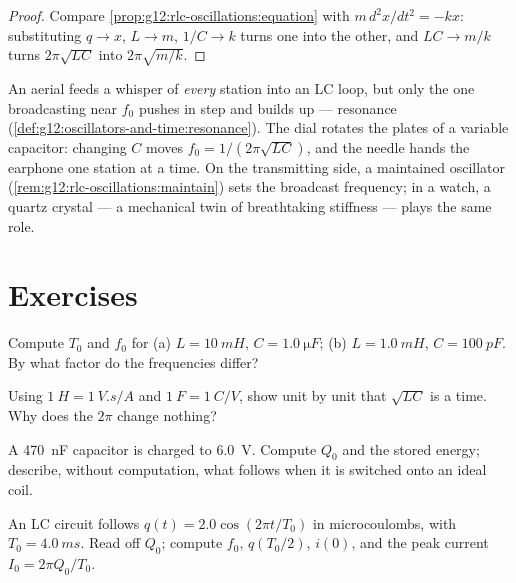 \begin{proof}
Compare \cref{prop:g12:rlc-oscillations:equation} with
$m\,d^2x/dt^2 = -kx$: substituting $q \to x$, $L \to m$, $1/C \to k$
turns one into the other, and $LC \to m/k$ turns
$2\pi\sqrt{LC}$ into $2\pi\sqrt{m/k}$.
\end{proof}

\begin{example}\label{ex:g12:rlc-oscillations:tuning}
An aerial feeds a whisper of \emph{every} station into an LC loop, but
only the one broadcasting near $f_0$ pushes in step and builds up ---
resonance (\cref{def:g12:oscillators-and-time:resonance}). The dial
rotates the plates of a variable capacitor: changing $C$ moves
$f_0 = 1/(2\pi\sqrt{LC})$, and the needle hands the earphone one
station at a time. On the transmitting side, a maintained oscillator
(\cref{rem:g12:rlc-oscillations:maintain}) sets the broadcast
frequency; in a watch, a quartz crystal --- a mechanical twin of
breathtaking stiffness --- plays the same role.
\end{example}

\section{Exercises}

\begin{exercise}[$\star$]\label{exo:g12:rlc-oscillations:1}
Compute $T_0$ and $f_0$ for (a) $L = \qty{10}{mH}$,
$C = \qty{1.0}{\micro F}$; (b) $L = \qty{1.0}{mH}$,
$C = \qty{100}{pF}$. By what factor do the frequencies differ?
\end{exercise}

\begin{exercise}[$\star$]\label{exo:g12:rlc-oscillations:2}
Using $\qty{1}{H} = \qty{1}{V.s/A}$ and $\qty{1}{F} = \qty{1}{C/V}$,
show unit by unit that $\sqrt{LC}$ is a time. Why does the $2\pi$
change nothing?
\end{exercise}

\begin{exercise}[$\star$]\label{exo:g12:rlc-oscillations:3}
A \qty{470}{nF} capacitor is charged to \qty{6.0}{V}. Compute $Q_0$
and the stored energy; describe, without computation, what follows
when it is switched onto an ideal coil.
\end{exercise}

\begin{exercise}[$\star$]\label{exo:g12:rlc-oscillations:4}
An LC circuit follows $q(t) = 2.0\cos(2\pi t/T_0)$ in microcoulombs,
with $T_0 = \qty{4.0}{ms}$. Read off $Q_0$; compute $f_0$, $q(T_0/2)$,
$i(0)$, and the peak current $I_0 = 2\pi Q_0/T_0$.
\end{exercise}

